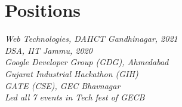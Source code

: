 \documentclass[]{deedy-resume-openfont}
\begin{document}
\begin{minipage}[t]{0.35\textwidth}

\section{Positions}
\footnotesize \textit{Web Technologies, DAIICT Gandhinagar, 2021}\\
\footnotesize \textit{DSA, IIT Jammu, 2020}\\

\footnotesize \textit{Google Developer Group (GDG), Ahmedabad}\\

\footnotesize \textit{Gujarat Industrial Hackathon (GIH)}\\

\footnotesize \textit{GATE (CSE), GEC Bhavnagar}\\

\footnotesize \textit{Led all 7 events in Tech fest of GECB}
\sectionsep

%
%

\end{minipage} 
\hfill
\end{document}
